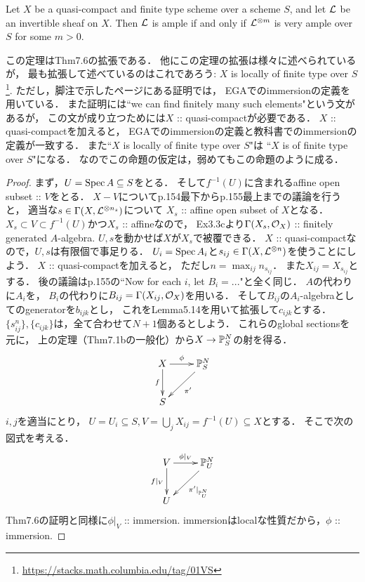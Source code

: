 \documentclass[a4paper]{jsarticle}
\begin{document}
    \begin{Thm}
        Let $X$ be a quasi-compact and finite type scheme over a scheme $S$,
        and let $\mathcal{L}$ be an invertible sheaf on $X$.
        Then $\mathcal{L}$ is ample if and only if 
        $\mathcal{L}^{\otimes m}$ is very ample over $S$ for some $m>0$.
    \end{Thm}
    \begin{Remark}
        この定理はThm7.6の拡張である．
        他にこの定理の拡張は様々に述べられているが，
        最も拡張して述べているのはこれであろう:
        $X$ is locally of finite type over $S$
        \footnote{ \url{https://stacks.math.columbia.edu/tag/01VS} }.
        ただし，脚注で示したページにある証明では，
        EGAでのimmersionの定義を用いている．
        また証明には``we can find finitely many such elements"という文があるが，
        この文が成り立つためには$X$ :: quasi-compactが必要である．
        $X$ :: quasi-compactを加えると，
        EGAでのimmersionの定義と教科書でのimmersionの定義が一致する．
        また``$X$ is locally of finite type over $S$"は
        ``$X$ is of finite type over $S$"になる．
        なのでこの命題の仮定は，弱めてもこの命題のように成る．
    \end{Remark}
    \begin{proof}
        まず，$U=\operatorname{Spec} A \subseteq S$をとる．
        そして$f^{-1}(U)$に含まれるaffine open subset :: $V$をとる．
        $X-V$についてp.154最下からp.155最上までの議論を行うと，
        適当な$s \in \Gamma(X, \mathcal{L}^{\otimes n_s})$について
        $X_s$ :: affine open subset of $X$となる．
        $X_s \subset V \subset f^{-1}(U)$かつ$X_s$ :: affineなので，
        Ex3.3cより$\Gamma(X_s, \mathcal{O}_X)$ :: finitely generated $A$-algebra.
        $U, s$を動かせば$X$が$X_s$で被覆できる．
        $X$ :: quasi-compactなので，$U, s$は有限個で事足りる．
        $U_i=\operatorname{Spec} A_i$と$s_{ij} \in \Gamma(X, \mathcal{L}^{\otimes n})$を使うことにしよう．
        $X$ :: quasi-compactを加えると，
        ただし$n=\max_{ij} n_{s_{ij}}$．
        また$X_{ij}=X_{s_{ij}}$とする．
        後の議論はp.155の``Now for each $i$, let $B_i=$..."と全く同じ．
        $A$の代わりに$A_i$を，
        $B_i$の代わりに$B_{ij}=\Gamma(X_{ij}, \mathcal{O}_X)$を用いる．
        そして$B_{ij}$の$A_i$-algebraとしてのgeneratorを$b_{ijk}$とし，
        これをLemma5.14を用いて拡張して$c_{ijk}$とする．
        $\{ s_{ij}^n \},\{ c_{ijk} \}$は，全て合わせて$N+1$個あるとしよう．
        これらのglobal sectionsを元に，
        上の定理（Thm7.1bの一般化）から$X \to \mathbb{P}^N_S$の射を得る．
        \[
        \xymatrix
        {
            X \ar[d]_-{f}\ar[r]^-{\phi}& \proj^N_S \ar[ld]^-{\pi'}\\
            S & {}
        }
        \]
        $i,j$を適当にとり，
        $U=U_i \subseteq S, V=\bigcup_j X_{ij}=f^{-1}(U) \subseteq X$とする．
        そこで次の図式を考える．
        \[
        \xymatrix
        {
            V \ar[d]_-{f|_V}\ar[r]^-{\phi|_V}& \proj^N_U \ar[ld]^-{\pi'|_{\proj^N_U}}\\
            U & {}
        }
        \]
        Thm7.6の証明と同様に$\phi|_V$ :: immersion.
        immersionはlocalな性質だから，$\phi$ :: immersion.
    \end{proof}
\end{document}
